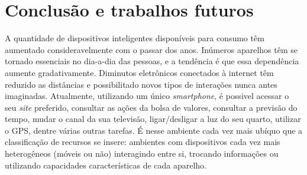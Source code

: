 \chapter{Conclusão e trabalhos futuros}

A quantidade de dispositivos inteligentes disponíveis para consumo têm aumentado consideravelmente com o passar dos anos. Inúmeros aparelhos têm se tornado essenciais no dia-a-dia das pessoas, e a tendência é que essa dependência aumente gradativamente. Diminutos eletrônicos conectados à internet têm reduzido as distâncias e possibilitado novos tipos de interações nunca antes imaginadas. Atualmente, utilizando um único \emph{smartphone}, é possivel acessar o seu \emph{site} preferido, consultar as ações da bolsa de valores, consultar a previsão do tempo, mudar o canal da sua televisão, ligar/desligar a luz do seu quarto, utilizar o GPS, dentre várias outras tarefas.
É nesse ambiente cada vez mais ubíquo que a classificação de recursos se insere: ambientes com dispositivos cada vez mais heterogêneos (móveis ou não) interagindo entre si, trocando informações ou utilizando capacidades características de cada aparelho.


